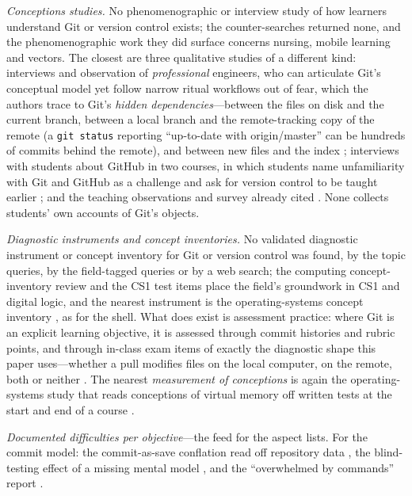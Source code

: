 \emph{Conceptions studies.}
No phenomenographic or interview study of how learners understand Git
or version control exists; the counter-searches returned none, and the
phenomenographic work they did surface concerns nursing, mobile learning
and vectors.
The closest are three qualitative studies of a different kind:
interviews and observation of \emph{professional} engineers, who can
articulate Git's conceptual model yet follow narrow ritual workflows out
of fear, which the authors trace to Git's \emph{hidden
dependencies}---between the files on disk and the current branch, between
a local branch and the remote-tracking copy of the remote (a \texttt{git
status} reporting \enquote{up-to-date with origin/master} can be
hundreds of commits behind the remote), and between new files and the
index \autocite{Church2014HiddenDependencies}; interviews with students
about GitHub in two courses, in which students name unfamiliarity with
Git and GitHub as a challenge and ask for version control to be taught
earlier \autocite{Feliciano2016GitHubStudents}; and the teaching
observations and survey already cited \autocite{IsomottonenCochez2014}.
None collects students' own accounts of Git's objects.

\emph{Diagnostic instruments and concept inventories.}
No validated diagnostic instrument or concept inventory for Git or
version control was found, by the topic queries, by the field-tagged
queries or by a web search; the computing concept-inventory review
\autocite{Taylor2014CI} and the CS1 test items
\autocite{Vahrenhold2014TestItems} place the field's groundwork in
CS1 and digital logic, and the nearest instrument is the
operating-systems concept inventory \autocite{WebbTaylor2014OSCI}, as
for the shell.
What does exist is assessment practice: where Git is an explicit
learning objective, it is assessed through commit histories and rubric
points, and through in-class exam items of exactly the diagnostic shape
this paper uses---whether a pull modifies files on the local computer,
on the remote, both or neither \autocite{Beckman2021GitLearningObjective}.
The nearest \emph{measurement of conceptions} is again the
operating-systems study that reads conceptions of virtual memory off
written tests at the start and end of a course
\autocite{Pamplona2024VirtualMemory}.

\emph{Documented difficulties per objective}---the feed for the aspect
lists.
For the commit model: the commit-as-save conflation read off repository
data \autocite{Cochez2013DVCSUsage}, the blind-testing effect of a
missing mental model \autocite{IsomottonenCochez2014}, and the
\enquote{overwhelmed by commands} report \autocite{Wagner2025RethinkGit}.

